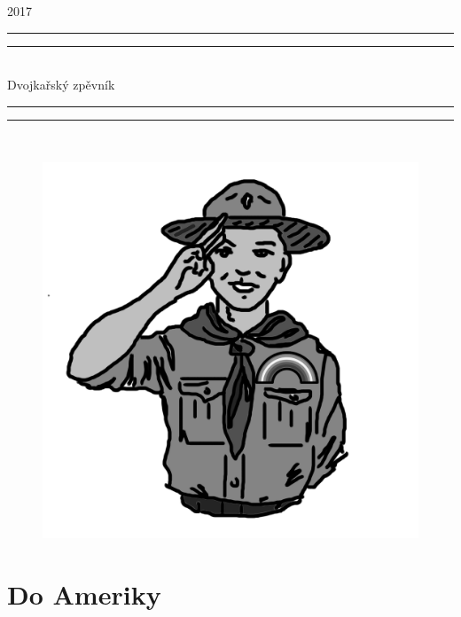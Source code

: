 \documentclass[openany]{memoir}
\newlength{\drop}
\begin{document}
\thispagestyle{empty}
\mainmatter
\thispagestyle{empty}
\newpage 
{ \vspace*{4cm}

   \textheight
    \centering
    
    \vspace*{\baselineskip}
    \scshape
2017
    \rule{\textwidth}{1.6pt}\vspace*{-\baselineskip}\vspace*{2pt}
    \rule{\textwidth}{0.4pt}\\[\baselineskip]
    {\LARGE Dvojkařský zpěvník}\\[0.2\baselineskip]
    \rule{\textwidth}{0.4pt}\vspace*{-\baselineskip}\vspace{3.2pt}
    \rule{\textwidth}{1.6pt}\\[\baselineskip]
    \scshape
\vspace{3.2cm}
 }  

\begin{figure}[h]
\centering
\includegraphics[scale=0.6]{obr/boyscout.jpg}
\end{figure}
\newpage
\tableofcontents

\chapter{Do Ameriky}
\end{document}
